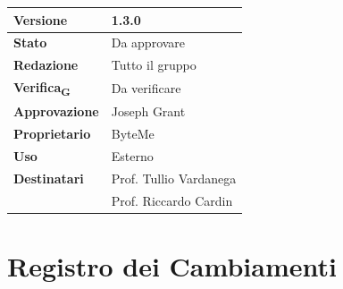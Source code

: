 \documentclass[11pt,a4paper]{article}
\newcommand{\gls}[1]{#1\textsubscript{G}}
\begin{document}
\begin{titlepage}
    \begin{table}[H]
        \centering
        \begin{tabular}{|l|p{5cm}|}
            \hline
            \textbf{Versione} & 1.3.0 \\
            \hline
            \textbf{Stato} & Da approvare \\
            \hline
            \textbf{Redazione} & Tutto il gruppo \\
            \hline
            \textbf{\gls{Verifica}} & Da verificare \\
            \hline
            \textbf{Approvazione} & Joseph Grant \\
            \hline
            \textbf{Proprietario} & ByteMe \\
            \hline
            \textbf{Uso} & Esterno \\
            \hline
            \textbf{Destinatari} & Prof. Tullio Vardanega \\ & Prof. Riccardo Cardin \\
            \hline
        \end{tabular}
    \end{table}
    
    \vfill
\end{titlepage}

\thispagestyle{empty}
\section*{Registro dei Cambiamenti}
\end{document}
